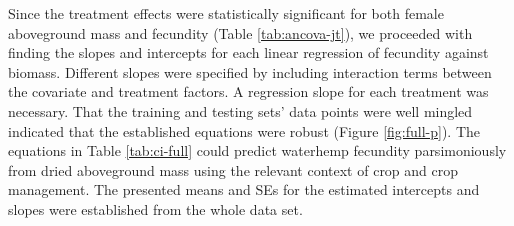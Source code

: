 \documentclass[
]{article}
\begin{document}
Since the treatment effects were statistically significant for both female aboveground mass and fecundity (Table \ref{tab:ancova-jt}), we proceeded with finding the slopes and intercepts for each linear regression of fecundity against biomass. Different slopes were specified by including interaction terms between the covariate and treatment factors. A regression slope for each treatment was necessary. That the training and testing sets' data points were well mingled indicated that the established equations were robust (Figure \ref{fig:full-p}). The equations in Table \ref{tab:ci-full} could predict waterhemp fecundity parsimoniously from dried aboveground mass using the relevant context of crop and crop management. The presented means and SEs for the estimated intercepts and slopes were established from the whole data set.
\end{document}
